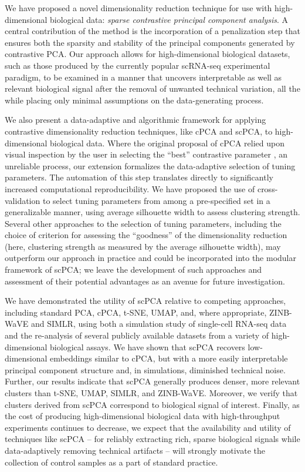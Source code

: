 We have proposed a novel dimensionality reduction technique for use with high-dimensional biological data: \textit{sparse contrastive principal component analysis}. A central contribution of the method is the incorporation of a penalization step that ensures both the sparsity and stability of the principal components generated by contrastive PCA. Our approach allows for high-dimensional biological datasets, such as those produced by the currently popular scRNA-seq experimental paradigm, to be examined in a manner that uncovers interpretable as well as relevant biological signal after the removal of unwanted technical variation, all the while placing only minimal assumptions on the data-generating process.

We also present a data-adaptive and algorithmic framework for applying contrastive dimensionality reduction techniques, like cPCA and scPCA, to high-dimensional biological data. Where the original proposal of cPCA relied upon visual inspection by the user in selecting the ``best'' contrastive parameter \citep{Abid2018}, an unreliable process, our extension formalizes the data-adaptive selection of tuning parameters. The automation of this step translates directly to significantly increased computational reproducibility. We have proposed the use of cross-validation to select tuning parameters from among a pre-specified set in a generalizable manner, using average silhouette width to assess clustering strength. Several other approaches to the selection of tuning parameters, including the choice of criterion for assessing the ``goodness'' of the dimensionality reduction (here, clustering strength as measured by the average silhouette width), may outperform our approach in practice and could be incorporated into the modular framework of scPCA; we leave the development of such approaches and assessment of their potential advantages as an avenue for future investigation.

We have demonstrated the utility of scPCA relative to competing approaches, including standard PCA, cPCA, t-SNE, UMAP, and, where appropriate, ZINB-WaVE and SIMLR, using both a simulation study of single-cell RNA-seq data and the re-analysis of several publicly available datasets from a variety of high-dimensional biological assays. We have shown that scPCA recovers low-dimensional embeddings similar to cPCA, but with a more easily interpretable principal component structure and, in simulations, diminished technical noise. Further, our results indicate that scPCA generally produces denser, more relevant clusters than t-SNE, UMAP, SIMLR, and ZINB-WaVE. Moreover, we verify that clusters derived from scPCA correspond to biological signal of interest. Finally, as the cost of producing high-dimensional biological data with high-throughput experiments continues to decrease, we expect that the availability and utility of techniques like scPCA -- for reliably extracting rich, sparse biological signals while data-adaptively removing technical artifacts -- will strongly motivate the collection of control samples as a part of standard practice.